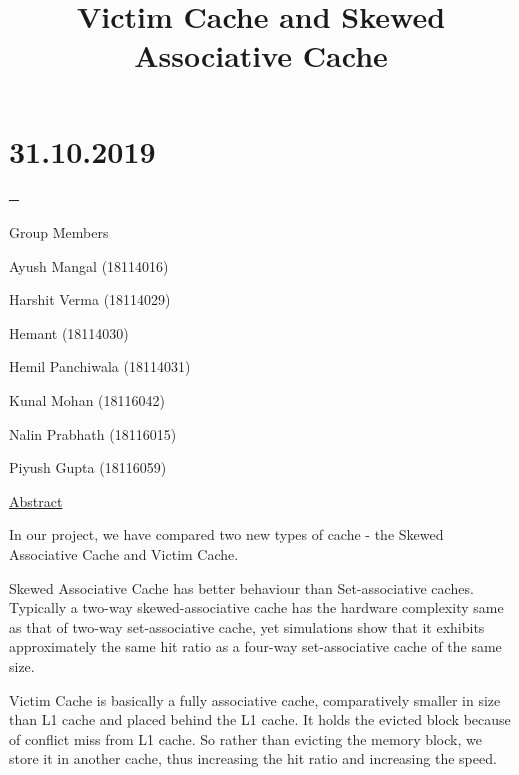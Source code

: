\documentclass[12pt]{article}
\title{{\myfont Victim Cache and Skewed Associative Cache}}
\date{}
\begin{document}
\maketitle
\par

\chapter{31.10.2019}\par

{\fontsize{18pt}{21.6pt}\selectfont \textbf{─}}

{\fontsize{16pt}{19.2pt}\selectfont \textcolor[HTML]{008575}{Group Members}\par}\par

Ayush Mangal (18114016)\par

Harshit Verma (18114029)\par

Hemant (18114030)\par

Hemil Panchiwala (18114031)\par

Kunal Mohan (18116042)\par

Nalin Prabhath (18116015)\par

Piyush Gupta (18116059)\par
\pagebreak
{\fontsize{24pt}{28.8pt}\selectfont \uline{Abstract}\par}\par
\par
In our project, we have compared two new types of cache - the Skewed Associative Cache and Victim Cache. \par

Skewed Associative Cache has better behaviour than Set-associative caches. Typically a two-way skewed-associative cache has the hardware complexity same as that of two-way set-associative cache, yet simulations show that it exhibits approximately the same hit ratio as a four-way set-associative cache of the same size. \par

Victim Cache is basically a fully associative cache, comparatively smaller in size than L1 cache and placed behind the L1 cache. It holds the evicted block because of conflict miss from L1 cache. So rather than evicting the memory block, we store it in another cache, thus increasing the hit ratio and increasing the speed.\par
\end{document}
